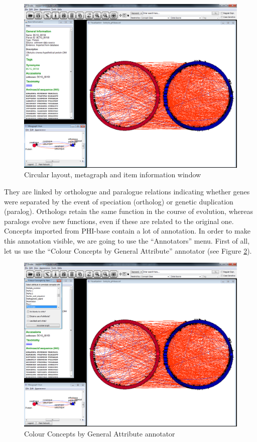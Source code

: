 \begin{figure}[H]
\centering
\includegraphics[scale=0.35]{images/Oct12/app2fig1.png} 
\caption{Circular layout, metagraph and item information window}
\label{fig:bot_metagraph}
\end{figure}

They are linked by orthologue and paralogue relations indicating whether genes were separated by the event of speciation (ortholog) or 
genetic duplication (paralog). 
Orthologs retain the same function in the course of evolution, whereas paralogs evolve new functions, even if these are related to the original one. 
Concepts imported from PHI-base contain a lot of annotation. 
In order to make this annotation visible, we are going to use the ``Annotators'' menu. 
First of all, let us use the ``Colour Concepts by General Attribute'' annotator (see Figure \ref{fig:bot_colbyval}).

\begin{figure}[H]
\centering
\includegraphics[scale=0.35]{images/Oct12/app2fig2.png} 
\caption{Colour Concepts by General Attribute annotator}
\label{fig:bot_colbyval}
\end{figure}


